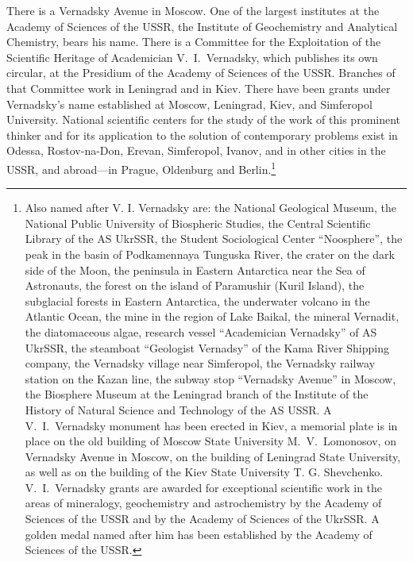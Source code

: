 There is a Vernadsky Avenue in Moscow.  One of the largest institutes at the
Academy of Sciences of the USSR, the Institute of Geochemistry and Analytical
Chemistry, bears his name.
There is a Committee for the Exploitation of the Scientific Heritage of
Academician V.~I.\ Vernadsky, which publishes its own circular, at the
Presidium of the Academy of Sciences of the USSR.  Branches of that Committee
work in Leningrad and in Kiev.  There have been grants under Vernadsky's name
established at Moscow, Leningrad, Kiev, and Simferopol University.  National
scientific centers for the study of the work of this prominent thinker and for
its application to the solution of contemporary problems exist in Odessa,
Rostov-na-Don, Erevan, Simferopol, Ivanov, and in other cities in the USSR, and
abroad---in Prague, Oldenburg and Berlin.\footnote{
	Also named after V. I.  Vernadsky are: the National Geological
	Museum, the National
	Public University of Biospheric Studies, the Central Scientific Library
	of the AS UkrSSR,
	the Student Sociological Center ``Noosphere'', the peak in the basin of
	Podkamennaya Tunguska River, the crater on the dark side of the Moon,
	the peninsula in Eastern Antarctica near the Sea of
	Astronauts, the forest on the island of
	Paramushir (Kuril Island), the subglacial forests in Eastern
	Antarctica, the underwater volcano in the Atlantic Ocean, the mine in
	the region of Lake Baikal, the mineral Vernadit, the diatomaceous
	algae, research vessel ``Academician Vernadsky'' of AS UkrSSR, the
	steamboat ``Geologist Vernadsy'' of the
	Kama River Shipping company,
	the Vernadsky village near Simferopol, the Vernadsky railway station on
	the Kazan line, the subway stop ``Vernadsky Avenue'' in Moscow, the
	Biosphere Museum at the Leningrad branch of the Institute of the
	History of Natural Science and Technology of the AS USSR.  A V.~I.\ 
	Vernadsky monument has been erected in Kiev, a memorial plate is in
	place on the old building of Moscow State University M.~V.\ 
	Lomonosov, on Vernadsky Avenue
	in Moscow, on the building of Leningrad State
	University,
	as well as on the building of the Kiev State University T. G.
	Shevchenko.\footnoteRus{Киевского государственного университета им. Т.
	Г.  Шевченко}  V.~I.\ Vernadsky grants are awarded for exceptional
	scientific work in the areas of mineralogy, geochemistry and
	astrochemistry by the Academy of Sciences of the USSR and by the
	Academy of Sciences of the UkrSSR.  A golden medal named after him has
	been established by the Academy of Sciences of the USSR.}

